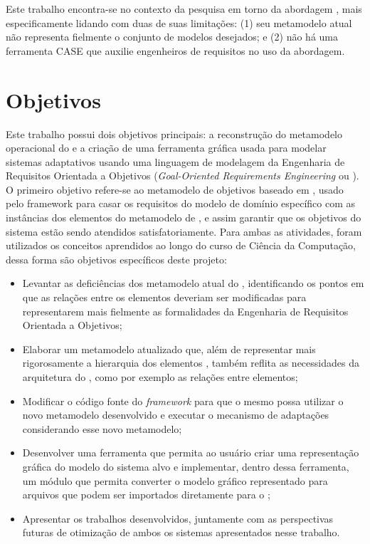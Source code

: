 Este trabalho encontra-se no contexto da pesquisa em torno da abordagem \zanshin, mais especificamente lidando com duas de suas limitações: (1) seu metamodelo atual não representa fielmente o conjunto de modelos desejados; e (2) não há uma ferramenta CASE que auxilie engenheiros de requisitos no uso da abordagem.



\section{Objetivos}
\label{sec-intro-objetivos}

Este trabalho possui dois objetivos principais: a reconstrução do metamodelo operacional do \zanshin e a criação de uma ferramenta gráfica usada para modelar sistemas adaptativos usando uma linguagem de modelagem da Engenharia de Requisitos Orientada a Objetivos (\textit{Goal-Oriented Requirements Engineering} ou \gore). O primeiro objetivo refere-se ao metamodelo de objetivos baseado em \istar, usado pelo framework para casar os requisitos do modelo de domínio específico com as instâncias dos elementos do metamodelo de \gore, e assim garantir que os objetivos do sistema estão sendo atendidos satisfatoriamente. Para ambas as atividades, foram utilizados os conceitos aprendidos ao longo do curso de Ciência da Computação, dessa forma são objetivos específicos deste projeto:


\begin{itemize}
	
	\item Levantar as deficiências dos metamodelo atual do \zanshin, identificando os pontos em que as relações entre os elementos deveriam ser modificadas para representarem mais fielmente as formalidades da Engenharia de Requisitos Orientada a Objetivos;
	
	\item Elaborar um metamodelo atualizado que, além de representar mais rigorosamente a hierarquia dos elementos \gore, também reflita as necessidades da arquitetura do \zanshin, como por exemplo as relações entre elementos;
	
	\item Modificar o código fonte do \textit{framework} para que o mesmo possa utilizar o novo metamodelo desenvolvido e executar o mecanismo de adaptações considerando esse novo metamodelo;
	
	\item Desenvolver uma ferramenta que permita ao usuário criar uma representação gráfica do modelo do sistema alvo e implementar, dentro dessa ferramenta, um módulo que permita converter o modelo gráfico representado para arquivos \xml que podem ser importados diretamente para o \zanshin;
	
	\item Apresentar os trabalhos desenvolvidos, juntamente com as perspectivas futuras de otimização de ambos os sistemas apresentados nesse trabalho.

\end{itemize}


